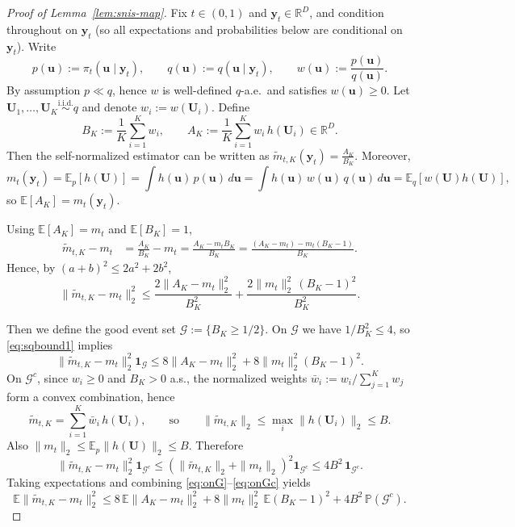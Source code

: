 \documentclass[12pt]{article}
\theoremstyle{definition} %
\newcommand{\R}{\mathbb{R}}
\renewcommand{\P}{\ensuremath{\mathbb{P}}} %
\newcommand{\y}{\bm y}
\providecommand{\E}{\mathbb{E}}
\begin{document}
\bigskip

\begin{proof}[Proof of Lemma~\ref{lem:snis-map}]
Fix $t\in(0,1)$ and $\y_t\in\R^D$, and condition throughout on $\y_t$ (so all expectations and probabilities below are conditional on $\y_t$).
Write
\[
p(\bm u):=\pi_t(\bm u\mid \y_t),\qquad
q(\bm u):=q(\bm u\mid \y_t),\qquad
w(\bm u):=\frac{p(\bm u)}{q(\bm u)}.
\]
By assumption $p\ll q$, hence $w$ is well-defined $q$-a.e.\ and satisfies $w(\bm u)\ge 0$.
Let $\bm U_1,\ldots,\bm U_K\stackrel{\text{i.i.d.}}{\sim}q$ and denote $w_i:=w(\bm U_i)$.
Define
\[
B_K:=\frac1K\sum_{i=1}^K w_i,\qquad
A_K:=\frac1K\sum_{i=1}^K w_i\,h(\bm U_i)\in\R^{D}.
\]
Then the self-normalized estimator can be written as
$
\widetilde m_{t,K}(\y_t)=\frac{A_K}{B_K}$. 
Moreover,
\[
m_t(\y_t)=\E_{p}[h(\bm U)]
=\int h(\bm u)\,p(\bm u)\,d\bm u
=\int h(\bm u)\,w(\bm u)\,q(\bm u)\,d\bm u
=\E_q[w(\bm U)h(\bm U)],
\]
so $\E[A_K]=m_t(\y_t)$.

Using $\E[A_K]=m_t$ and $\E[B_K]=1$,
\begin{align}
\widetilde m_{t,K}-m_t
&=\frac{A_K}{B_K}-m_t
=\frac{A_K-m_t B_K}{B_K}
=\frac{(A_K-m_t)-m_t(B_K-1)}{B_K}.
\label{eq:decomp}
\end{align}
Hence, by $(a+b)^2\le 2a^2+2b^2$,
\begin{equation}
\label{eq:sqbound1}
\|\widetilde m_{t,K}-m_t\|_2^2
\le \frac{2\|A_K-m_t\|_2^2}{B_K^2}
+\frac{2\|m_t\|_2^2\,(B_K-1)^2}{B_K^2}.
\end{equation}

Then we define the good event set 
$
\mathcal{G}:=\{B_K\ge 1/2\}$.
On $\mathcal{G}$ we have $1/B_K^2\le 4$, so \eqref{eq:sqbound1} implies
\begin{equation}
\label{eq:onG}
\|\widetilde m_{t,K}-m_t\|_2^2\mathbf{1}_{\mathcal{G}}
\le 8\|A_K-m_t\|_2^2+8\|m_t\|_2^2(B_K-1)^2.
\end{equation}
On $\mathcal{G}^c$, since $w_i\ge 0$ and $B_K>0$ a.s., the normalized weights
$\bar w_i:=w_i/\sum_{j=1}^K w_j$ form a convex combination, hence
\[
\widetilde m_{t,K}=\sum_{i=1}^K \bar w_i\,h(\bm U_i),
\qquad\text{so}\qquad
\|\widetilde m_{t,K}\|_2\le \max_i \|h(\bm U_i)\|_2\le B.
\]
Also $\|m_t\|_2\le \E_p\|h(\bm U)\|_2\le B$. Therefore
\begin{equation}
\label{eq:onGc}
\|\widetilde m_{t,K}-m_t\|_2^2\mathbf{1}_{\mathcal{G}^c}
\le (\|\widetilde m_{t,K}\|_2+\|m_t\|_2)^2\mathbf{1}_{\mathcal{G}^c}
\le 4B^2\,\mathbf{1}_{\mathcal{G}^c}.
\end{equation}
Taking expectations and combining \eqref{eq:onG}--\eqref{eq:onGc} yields
\begin{equation}
\label{eq:snis-split}
\E\|\widetilde m_{t,K}-m_t\|_2^2
\le 8\,\E\|A_K-m_t\|_2^2
+8\|m_t\|_2^2\,\E(B_K-1)^2
+4B^2\,\P(\mathcal{G}^c).
\end{equation}


\end{proof}
\end{document}
